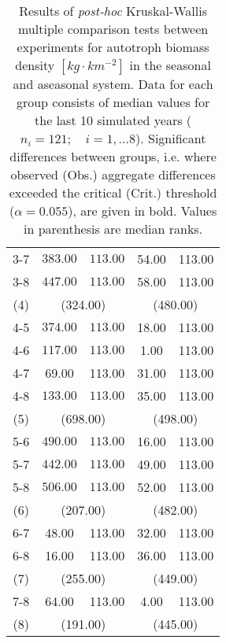 \begin{table}[ht]
\begin{tabular*}{\textwidth}{@{\extracolsep{\fill} }ccccc}
  3-7 & \(\mathbf{383.00}\) & \(\mathbf{113.00}\) & 54.00 & 113.00 \\ 
  3-8 & \(\mathbf{447.00}\) & \(\mathbf{113.00}\) & 58.00 & 113.00 \\ 
   [1ex]
(4) & \multicolumn{2}{c}{(324.00)} & \multicolumn{2}{c}{(480.00)} \\   
   4-5 & \(\mathbf{374.00}\) & \(\mathbf{113.00}\) & 18.00 & 113.00 \\ 
  4-6 & \(\mathbf{117.00}\) & \(\mathbf{113.00}\) & 1.00 & 113.00 \\ 
  4-7 & 69.00 & 113.00 & 31.00 & 113.00 \\ 
  4-8 & \(\mathbf{133.00}\) & \(\mathbf{113.00}\) & 35.00 & 113.00 \\ 
   [1ex]
(5) & \multicolumn{2}{c}{(698.00)} & \multicolumn{2}{c}{(498.00)} \\   
   5-6 & \(\mathbf{490.00}\) & \(\mathbf{113.00}\) & 16.00 & 113.00 \\ 
  5-7 & \(\mathbf{442.00}\) & \(\mathbf{113.00}\) & 49.00 & 113.00 \\ 
  5-8 & \(\mathbf{506.00}\) & \(\mathbf{113.00}\) & 52.00 & 113.00 \\ 
   [1ex]
(6) & \multicolumn{2}{c}{(207.00)} & \multicolumn{2}{c}{(482.00)} \\   
   6-7 & 48.00 & 113.00 & 32.00 & 113.00 \\ 
  6-8 & 16.00 & 113.00 & 36.00 & 113.00 \\ 
   [1ex]
   (7) & \multicolumn{2}{c}{(255.00)} & \multicolumn{2}{c}{(449.00)} \\
   7-8 & 64.00 & 113.00 & 4.00 & 113.00 \\[1ex]
   (8) & \multicolumn{2}{c}{(191.00)} & \multicolumn{2}{c}{(445.00)} \\ 
   \bottomrule
\end{tabular*}
\caption[Kruskal-Wallis multiple comparison of autotroph biomass density.]{Results of \textit{post-hoc} Kruskal-Wallis multiple comparison
                tests between experiments for autotroph biomass density $[kg\cdot km^{-2}]$ in the seasonal and aseasonal system. 
                  Data for each group consists of median values for the last 10 simulated years ($n_{i} = 121; \quad i = 1,\ldots8$). 
                  Significant differences between groups, i.e. where observed (Obs.) aggregate differences exceeded the critical (Crit.) threshold ($\alpha = 0.055$), are given in bold. Values in parenthesis are median ranks.} 
\label{tab:chap:res:dyn:autoBMD}
\end{table}
